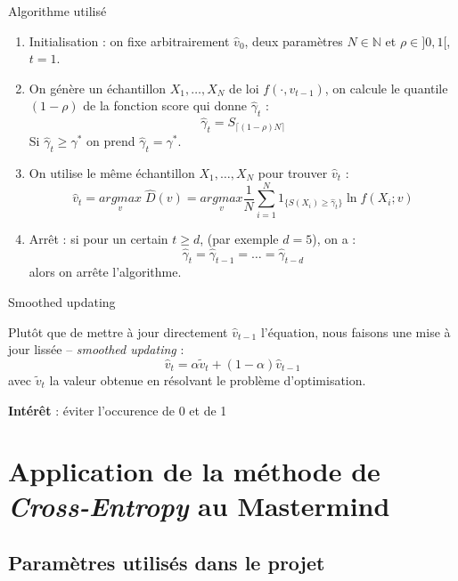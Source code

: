 \documentclass[10pt,xcolor=table,color={dvipsnames,usenames},ignorenonframetext,usepdftitle=false,french]{beamer}
\begin{document}
\begin{frame}{Algorithme utilisé}

\begin{enumerate}

\item Initialisation : on fixe arbitrairement $\hat{v}_{0}$, deux paramètres $N\in \mathbb N$ et $\rho\in]0,1[$, $t = 1$.  
\item On génère un échantillon $X_{1},\dots,X_{N}$ de loi $f(\cdot,v_{t-1})$, on calcule le quantile $(1-\rho)$ de la fonction score qui donne $\hat{\gamma}_{t}$ :
$$\hat{\gamma}_{t}=S_{\lceil(1-\rho)N\rceil}$$
Si $\hat{\gamma}_{t}\geq\gamma^*$ on prend $\hat{\gamma}_{t}=\gamma^*$.  
\item On utilise le même échantillon $X_{1},\dots,X_{N}$ pour trouver $\hat{v}_{t}$ :
\begin{equation}
\hat{v}_{t}=\underset{v}{argmax}\;\hat{D}(v)=\underset{v}{argmax}\frac{1}{N}\sum_{i=1}^{N}1_{\{S(X_{i})\geq\hat{\gamma}_{t}\}}\ln f(X_{i};v)
\end{equation}
\item Arrêt : si pour un certain $t\geq d$, (par exemple $d=5$), on a : 
$$\hat{\gamma}_{t}=\hat{\gamma}_{t-1}=\dots=\hat{\gamma}_{t-d}$$
alors on arrête l'algorithme.
\end{enumerate}

\end{frame}

\begin{frame}{Smoothed updating}

Plutôt que de mettre à jour directement \(\hat{v}_{t-1}\) l'équation,
nous faisons une mise à jour lissée -- \emph{smoothed updating} : \[
\hat{v}_{t}=\alpha\tilde{v}_{t}+(1-\alpha)\hat{v}_{t-1}
\] avec \(\tilde{v}_{t}\) la valeur obtenue en résolvant le problème
d'optimisation.

\textbf{Intérêt} : éviter l'occurence de 0 et de 1

\end{frame}

\section{\texorpdfstring{Application de la méthode de
\emph{Cross-Entropy} au
Mastermind}{Application de la méthode de Cross-Entropy au Mastermind}}\label{sec:q1}

\subsection{Paramètres utilisés dans le
projet}\label{paramuxe8tres-utilisuxe9s-dans-le-projet}
\end{document}
